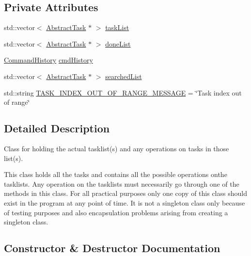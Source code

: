 \subsection*{Private Attributes}
\begin{DoxyCompactItemize}
\item 
std\+::vector$<$ \hyperlink{class_do_lah_1_1_abstract_task}{Abstract\+Task} $\ast$ $>$ \hyperlink{class_do_lah_1_1_calendar_aec812b23859cfd1e7cce11d4efe1ff56}{task\+List}
\item 
std\+::vector$<$ \hyperlink{class_do_lah_1_1_abstract_task}{Abstract\+Task} $\ast$ $>$ \hyperlink{class_do_lah_1_1_calendar_a7d8b88d505dfdf50201129928c7cb97b}{done\+List}
\item 
\hyperlink{class_do_lah_1_1_command_history}{Command\+History} \hyperlink{class_do_lah_1_1_calendar_a4324df6d3d33b55375d650a5baa41e3a}{cmd\+History}
\item 
std\+::vector$<$ \hyperlink{class_do_lah_1_1_abstract_task}{Abstract\+Task} $\ast$ $>$ \hyperlink{class_do_lah_1_1_calendar_a4354b2eeb2a32b579dcab4d16fbe3f9f}{searched\+List}
\item 
std\+::string \hyperlink{class_do_lah_1_1_calendar_a6bb6992b8aeb30195175e1b742a7f2fa}{T\+A\+S\+K\+\_\+\+I\+N\+D\+E\+X\+\_\+\+O\+U\+T\+\_\+\+O\+F\+\_\+\+R\+A\+N\+G\+E\+\_\+\+M\+E\+S\+S\+A\+G\+E} = \char`\"{}Task index out of range\char`\"{}
\end{DoxyCompactItemize}


\subsection{Detailed Description}
Class for holding the actual tasklist(s) and any operations on tasks in those list(s). 

This class holds all the tasks and contains all the possible operations onthe tasklists. Any operation on the tasklists must necessarily go through one of the methods in this class. For all practical purposes only one copy of this class should exist in the program at any point of time. It is not a singleton class only because of testing purposes and also encapsulation problems arising from creating a singleton class. 

\subsection{Constructor \& Destructor Documentation}
\hypertarget{class_do_lah_1_1_calendar_afde5e203ea4cb45ecf4d2cabce19826e}{}

